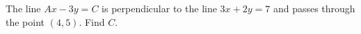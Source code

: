 The line $Ax-3y=C$ is perpendicular to the line $3x+2y=7$ and passes through the point $(4,5)$. Find $C$.
